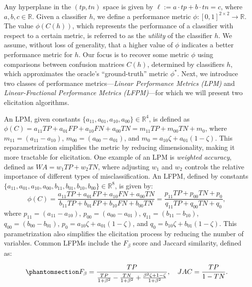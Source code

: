 \documentclass[
  letterpaper,
  numbers=noenddot,
  DIV=11]{scrreprt}
\theoremstyle{plain}
\theoremstyle{definition}
\theoremstyle{remark}
\begin{document}
Any hyperplane in the \((tp, tn)\) space is given by
\(\ell := a \cdot tp + b \cdot tn = c\), where
\(a, b, c \in \mathbb{R}\). Given a classifier \(h\), we define a
performance metric
\(\phi : [0, 1]^{2 \times 2} \rightarrow \mathbb{R}\). The value
\(\phi(C(h))\), which represents the performance of a classifier with
respect to a certain metric, is referred to as the \emph{utility} of the
classifier \(h\). We assume, without loss of generality, that a higher
value of \(\phi\) indicates a better performance metric for \(h\). Our
focus is to recover some metric \(\phi\) using comparisons between
confusion matrices \(C(h)\), determined by classifiers \(h\), which
approximates the oracle's ``ground-truth'' metric \(\phi^*\). Next, we
introduce two classes of performance metrics---\emph{Linear Performance
Metrics (LPM)} and \emph{Linear-Fractional Performance Metrics
(LFPM)}---for which we will present two elicitation algorithms.

An LPM, given constants
\(\{a_{11}, a_{01}, a_{10}, a_{00}\} \in \mathbb{R}^{4}\), is defined as
\(\phi(C) = a_{11} TP + a_{01} FP + a_{10} FN + a_{00} TN = m_{11} TP + m_{00} TN + m_{0}\),
where \(m_{11} = (a_{11} - a_{10})\), \(m_{00} = (a_{00} - a_{01})\),
and \(m_{0} = a_{10} \zeta + a_{01} (1 - \zeta)\). This
reparametrization simplifies the metric by reducing dimensionality,
making it more tractable for elicitation. One example of an LPM is
\emph{weighted accuracy}, defined as \(WA = w_1TP + w_2TN\), where
adjusting \(w_1\) and \(w_2\) controls the relative importance of
different types of misclassification. An LFPM, defined by constants
\(\{a_{11}, a_{01}, a_{10}, a_{00}, b_{11}, b_{01}, b_{10}, b_{00}\} \in \mathbb{R}^{8}\),
is given by:
\[\phi(C) = \frac{a_{11} TP + a_{01} FP + a_{10} FN + a_{00} TN}{b_{11} TP + b_{01} FP + b_{10} FN + b_{00} TN} = \frac{p_{11} TP + p_{00} TN + p_{0}}{q_{11} TP + q_{00} TN + q_{0}},\]
where \(p_{11} = (a_{11} - a_{10})\), \(p_{00} = (a_{00} - a_{01})\),
\(q_{11} = (b_{11} - b_{10})\), \(q_{00} = (b_{00} - b_{01})\),
\(p_{0} = a_{10} \zeta + a_{01} (1 - \zeta)\), and
\(q_{0} = b_{10} \zeta + b_{01} (1 - \zeta)\). This parametrization also
simplifies the elicitation process by reducing the number of variables.
Common LFPMs include the \(F_\beta\) score and Jaccard similarity,
defined as:

\begin{equation}\phantomsection\label{eq-lfpm_metrics}{F_{\beta} = \frac{TP}{\frac{TP}{1+\beta^{2}} - \frac{TN}{1+\beta^{2}} + \frac{\beta^{2} \zeta + 1 - \zeta}{1+\beta^{2}}}, \quad JAC = \frac{TP}{1 - TN}.}\end{equation}
\end{document}
